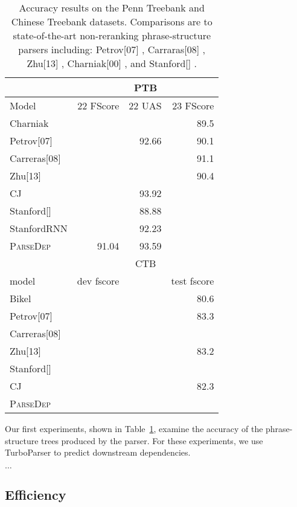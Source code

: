 \documentclass[11pt,letterpaper]{article}
\begin{document}
\begin{table}
  \centering
  \small 
  \begin{tabular}{|l|rrr|}
    \hline
    & \multicolumn{3}{|c|}{PTB} \\
    \hline

    \hline
    Model & 22 FScore & 22 UAS & 23 FScore  \\
    \hline
    Charniak          & & & 89.5\\
    Petrov[07]        & & 92.66 & 90.1 \\
    Carreras[08]      & &  & 91.1 \\
    Zhu[13]           & &  & 90.4 \\
    CJ                & & 93.92 & \\
    Stanford[]        & & 88.88 & \\
    StanfordRNN       & & 92.23 & \\
    \textsc{ParseDep} & 91.04 & 93.59 & \\
    \hline
    \hline
    & \multicolumn{3}{|c|}{CTB} \\
    model &  dev fscore & & test fscore  \\
    \hline

    \hline
    Bikel         & & & 80.6 \\
    Petrov[07]    & & & 83.3 \\
    Carreras[08]  & & & \\
    Zhu[13]       & & & 83.2 \\
    Stanford[]    & & & \\
    CJ  & & & 82.3 \\
    \textsc{ParseDep} & & & \\
    \hline
  \end{tabular}
  \label{tab:acc}
  \caption{ Accuracy results on the Penn Treebank and Chinese Treebank datasets. Comparisons are to state-of-the-art non-reranking phrase-structure parsers including:  Petrov[07] \cite{petrov2006learning}, Carraras[08] \cite{carreras2008tag}, Zhu[13] \cite{zhu2013fast}, Charniak[00] \cite{charniak2000maximum}, and Stanford[] \cite{}.    }
\end{table}

Our first experiments, shown in Table~\ref{tab:acc}, examine the accuracy of the phrase-structure trees produced by the parser. For these experiments,
we use TurboParser \cite{martins2013turning} to predict downstream dependencies.

$\ldots$


\subsection{Efficiency}
\end{document}
